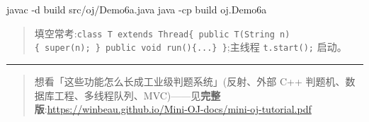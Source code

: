 \documentclass[
  11pt,
]{ctexart}
\newenvironment{Shaded}{\begin{snugshade}}{\end{snugshade}}
\newcommand{\AttributeTok}[1]{\textcolor[rgb]{0.13,0.29,0.53}{#1}}
\newcommand{\ExtensionTok}[1]{#1}
\newcommand{\NormalTok}[1]{#1}
\begin{document}
\begin{Shaded}
\begin{Highlighting}[]
\ExtensionTok{javac} \AttributeTok{{-}d}\NormalTok{ build src/oj/Demo6a.java}
\ExtensionTok{java} \AttributeTok{{-}cp}\NormalTok{ build oj.Demo6a}
\end{Highlighting}
\end{Shaded}

\begin{quote}
填空常考:\texttt{class\ T\ extends\ Thread\{\ public\ T(String\ n)\{\ super(n);\ \}\ public\ void\ run()\{...\}\ \}};主线程
\texttt{t.start();} 启动。
\end{quote}

\begin{center}\rule{0.5\linewidth}{0.5pt}\end{center}

\begin{quote}
想看「这些功能怎么长成工业级判题系统」(反射、外部 C++
判题机、数据库工程、多线程队列、MVC)------见\textbf{完整版}:\url{https://winbeau.github.io/Mini-OJ-docs/mini-oj-tutorial.pdf}
\end{quote}
\end{document}
